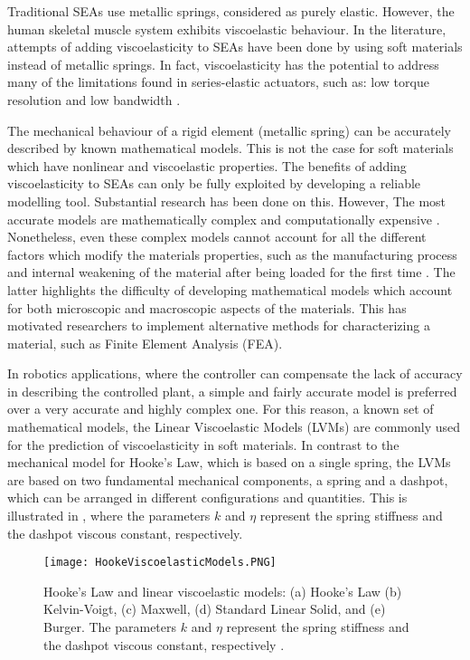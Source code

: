 Traditional SEAs use metallic springs, considered as purely elastic. However, the human skeletal muscle system exhibits viscoelastic behaviour. In the literature, attempts of adding viscoelasticity to SEAs have been done by using soft materials instead of metallic springs. In fact, viscoelasticity has the potential to address many of the limitations found in series-elastic actuators, such as: low torque resolution and low bandwidth \cite{martins2015polyurethane,tagliamonte2014rendering,schepelmann2014compact}. 

The mechanical behaviour of a rigid element (metallic spring) can be accurately described by known mathematical models. This is not the case for soft materials which have nonlinear and viscoelastic properties. The benefits of adding viscoelasticity to SEAs can only be fully exploited by developing a  reliable modelling tool. Substantial research has been done on this. However, The most accurate models are mathematically complex and computationally expensive \cite{xu2014mathematical,ciniello2017identifying,lu2017constitutive}. Nonetheless, even these complex models cannot account for all the different factors which modify the materials properties, such as the manufacturing process and internal weakening of the material after being loaded for the first time \cite{case2015soft}. The latter highlights the difficulty of developing mathematical models which account for both microscopic and macroscopic aspects of the materials. This has motivated researchers to implement alternative methods for characterizing a material, such as Finite Element Analysis (FEA).

In robotics applications, where the controller can compensate the lack of accuracy in describing the controlled plant, a simple and fairly accurate model is preferred over a very accurate and highly complex one. For this reason, a known set of mathematical models, the Linear Viscoelastic Models (LVMs) are commonly used for the prediction of viscoelasticity in soft materials. In contrast to the mechanical model for Hooke's Law, which is based on a single spring, the LVMs are based on two fundamental mechanical components, a spring and a dashpot, which can be arranged in different configurations and quantities. This is illustrated in , where the parameters $k$ and $\eta$ represent the spring stiffness and the dashpot viscous constant, respectively.

\begin{figure}[hbt!]
	\centering
    \texttt{[image: HookeViscoelasticModels.PNG]}
    \caption{Hooke's Law and linear viscoelastic models: (a) Hooke's Law (b) Kelvin-Voigt, (c) Maxwell, (d) Standard Linear Solid, and (e) Burger. The parameters $k$ and $\eta$ represent the spring stiffness and the dashpot viscous constant, respectively \cite{austin2015control}. }
    \label{fig:LinearViscoelasticModels}
\end{figure}

